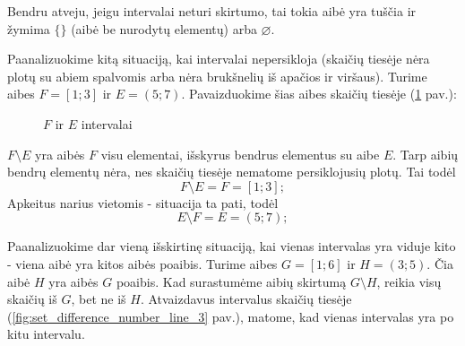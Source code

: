 \documentclass[a4paper]{article}
\newcommand{\germanqq}[1]{{\selectlanguage{german}\glqq#1\grqq\selectlanguage{english}}}
\begin{document}
Bendru atveju, jeigu intervalai neturi skirtumo, tai tokia aibė yra tuščia ir
žymima $\{\}$
(aibė be nurodytų elementų) arba $\varnothing$.

Paanalizuokime kitą situaciją, kai intervalai nepersikloja (skaičių tiesėje
nėra plotų su abiem spalvomis arba nėra brukšnelių iš apačios ir viršaus).
Turime aibes $F=[1; 3]$ ir $E=(5;7)$. Pavaizduokime šias aibes skaičių tiesėje
(\ref{fig:set_difference_number_line_2} pav.):

\begin{figure}[!htbp]
      \centering
      \caption{$F$ ir $E$ intervalai}\label{fig:set_difference_number_line_2}
\end{figure}

$F \setminus E$ yra aibės $F$ visu elementai, išskyrus bendrus elementus su
aibe $E$. Tarp aibių bendrų elementų nėra, nes skaičių tiesėje nematome
persiklojusių plotų. Tai todėl
\[F \setminus E = F = [1;3];\]
Apkeitus narius vietomis - situacija ta pati, todėl
\[E \setminus F = E = (5;7);\]

Paanalizuokime dar vieną išskirtinę situaciją, kai vienas intervalas yra viduje
kito - viena aibė yra kitos aibės poaibis. Turime aibes $G=[1;6]$ ir
$H=(3;5)$. Čia aibė $H$ yra aibės $G$ poaibis. Kad surastumėme aibių skirtumą
$G \setminus H$, reikia visų skaičių iš $G$, bet ne iš $H$. Atvaizdavus
intervalus skaičių tiesėje (\ref{fig:set_difference_number_line_3} pav.),
matome, kad vienas intervalas yra \germanqq{po} kitu intervalu.
\end{document}
